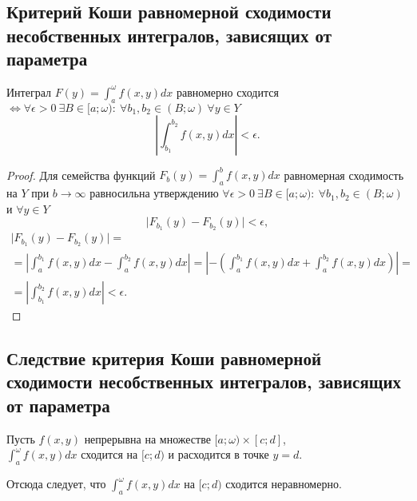 \subsection{Критерий Коши равномерной сходимости несобственных интегралов, зависящих от параметра}

\begin{theorem}
    Интеграл $F(y) = \int_{a}^{\omega}f(x,y)dx$ равномерно сходится $\iff \forall \epsilon > 0 \ \exists B \in [a;\omega): \ \forall b_1,b_2 \in (B;\omega) \ \forall y \in Y$
    \[
        \left|\int_{b_1}^{b_2}f(x,y)dx\right| < \epsilon.
    \]
\end{theorem}

\begin{proof}
    Для семейства функций $F_b(y) = \int_{a}^{b}f(x,y)dx$ равномерная сходимость на $Y$ при $b\rightarrow\infty$ равносильна утверждению $\forall \epsilon > 0 \ \exists B \in [a;\omega): \ \forall b_1,b_2 \in (B;\omega)$ и $\forall y \in Y$
    \[
        \big|F_{b_1}(y) - F_{b_2}(y)\big| < \epsilon,
    \]
    \begin{multline*}
        \big|F_{b_1}(y) - F_{b_2}(y)\big| = \\
        = \left|\int_{a}^{b_1}f(x,y)dx - \int_{a}^{b_2}f(x,y)dx\right| = \left|-\left(\int_{a}^{b_1}f(x,y)dx + \int_{a}^{b_2}f(x,y)dx\right)\right| = \\
        = \left|\int_{b_1}^{b_2}f(x,y)dx\right| < \epsilon.
    \end{multline*}
\end{proof}

\subsection{Следствие критерия Коши равномерной сходимости несобственных интегралов, зависящих от параметра}

\begin{corollary}
    Пусть $f(x,y)$ непрерывна на множестве $[a;\omega)\times[c;d] $, \\ $\int_{a}^{\omega}f(x,y)dx$ сходится на $[c;d)$ и расходится в точке $y = d$.

    Отсюда следует, что $\int_{a}^{\omega}f(x,y)dx$ на $[c;d)$ сходится неравномерно.
\end{corollary}

